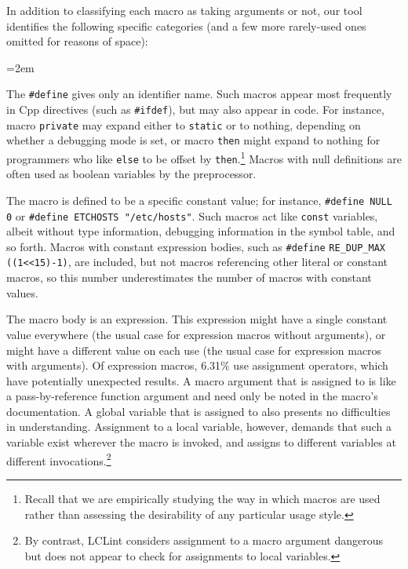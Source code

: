 \documentclass[11pt]{article}
\begin{document}
In addition to classifying each macro as taking arguments or not, our tool
identifies the following specific categories (and a few more rarely-used
ones omitted for reasons of space):
\begin{description}
  \sloppy
  \emergencystretch=2em

\item[Null define]  The {\tt \#define} gives only an
identifier name.  Such macros appear most frequently in Cpp directives
(such as {\tt \#ifdef}), but may also appear in code.  For instance,
macro {\tt private} may expand either to {\tt static} or to nothing,
depending on whether a debugging mode is set, or macro {\tt then} might
expand to nothing for programmers who like {\tt else} to be offset by
{\tt then}.\footnote{Recall that we are empirically studying the way
in which macros are used rather than assessing the desirability of any
particular usage style.}  Macros with null definitions are often used as boolean
variables by the preprocessor.

\item[Literal] The macro is defined to be a specific constant value;
  for instance, {\tt \#define NULL 0} or 
  {\tt \#define ETCHOSTS "/etc/hosts"}.  Such macros act like {\tt const}
  variables, albeit 
  without type information, debugging information in the symbol table,
  and so forth.  Macros with constant expression bodies, such as
  \verb|#define| \verb|RE_DUP_MAX| \verb|((1<<15)-1)|, are included, but
  not macros referencing other literal or constant macros, so this number
  underestimates the number of macros with constant values.

\item[Expression]  The macro body is an expression.  This expression
  might have a single constant value everywhere (the usual case for
  expression macros without arguments), or might have a different value on
  each use (the usual case for expression macros with arguments).  Of
  expression macros, 6.31\% use assignment operators,
  which have potentially unexpected results.  A macro argument that is
  assigned to is like a pass-by-reference function argument and need only
  be noted in the macro's documentation.  A global variable that is
  assigned to also presents no difficulties in understanding.  Assignment
  to a local variable, however, demands that such a variable exist wherever
  the macro is invoked, and assigns to different variables at different
  invocations.\footnote{By contrast, LCLint considers assignment to a macro
  argument dangerous but does not appear to check for assignments to local
  variables.}


\end{description}
\end{document}
